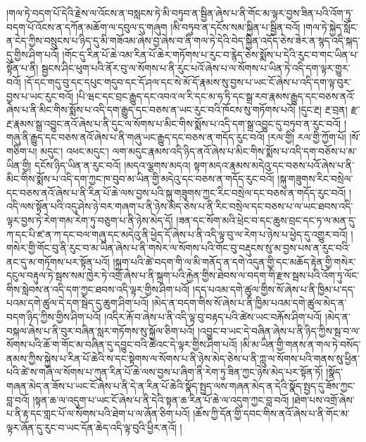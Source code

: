 །གལ་ཏེ་བདག་པོ་དེའི་རྗེས་ལ་འོངས་ན་བསླངས་ཏེ་མི་བཏུབ་ན་སྦྱིན་ཞེས་པ་ནི་གོང་མ་ལྟར་བྱས་ཟིན་པའི་འོག་ཏུ་བདག་པོ་འོངས་ན་དཀོན་མཆོག་ལ་དབུལ་དུ་གཞུག །མི་བཏུབ་ན་དངོས་སམ་སྐྱིན་པ་སྦྱིན་བའོ། །གལ་ཏེ་སྐྱེད་སློང་ན་ངེད་ཀྱིས་བསྲུངས་པ་ཉིད་དུ་མི་གཟོའམ་ཞེས་བྱ་ཞེས་བ་ནི་གལ་ཏེ་དེའི་བེད་སྐྱིན་འདོད་ཅེས་ཟེར་ན་སྙད་འདི་སྐད་དུ་གྱིས་ཤིག་པའོ། །གོང་དུ་རིན་པོ་ཆེ་འམ་རིན་པོ་ཆེར་གཏོགས་པ་རུང་བ་རྙེད་ཅེས་སྨོས་པ་དེའི་རུང་བ་གང་ཡིན་པ་སྟོན་པ་ནི། སྦྱངས་ཤིང་ཕུག་པའི་ནོར་བུ་ལ་སོགས་པ་ནི་རུང་པའོ་ཞེས་པ་ལ་སོགས་པ་ཡིན་ཏེ་འདི་དག་ལྟར་གྱུར་བའོ། །དོ་དང་གདུ་བུ་དང་དཔུང་གདུབ་དང་དོ་ཤལ་དང་སེ་མོ་དོ་རྣམས་སུ་བྱས་པ་ཡང་ངོ་ཞེས་པ་འདི་དག་ལྟ་བུར་བྱས་པ་ཡང་རུང་བའོ། །པི་ཝང་དང་བྲང་རྒྱུད་དང་འབའ་ལ་རི་དང་མ་ཧ་ཏི་དང་སྒྲ་རབ་རྣམས་རྒྱུད་དང་བཅས་ནའོ་ཞེས་པ་ནི་མིང་གིས་སྨོས་པ་འདི་དག་རྒྱུད་དང་བཅས་ན་ཡང་རུང་བའི་ཁོངས་སུ་གཏོགས་པའོ། །དུང་རྔ།  རྔ་བྲན། རྫ་རྔ་རྣམས་སྒྲ་འབྱུང་ནའོ་ཞེས་པ་ནི་དུང་ལ་སོགས་པ་མིང་གིས་སྨོས་པ་འདི་དག་སྒྲ་འབྱུང་དུ་བཏུབ་ན་རུང་བའོ། །གཞུ་ནི་རྒྱུད་དང་བཅས་ནའོ་ཞེས་པ་ནི་གཞུ་ཡང་རྒྱུད་དང་བཅས་ན་གདོད་རུང་བའོ། །རལ་གྱི། རལ་གྱི་ཀྱོག་པོ། །སོ་གཅིག་པ། མདུང་། འཕང་མདུང་། ལག་མདུང་རྣམས་འདི་ཉིད་ནའོ་ཞེས་པ་མིང་གིས་སྨོས་པ་འདི་དག་བཅོས་པ་མ་ཡིན་གྱི། དངོས་ཉིད་ཡིན་ན་རུང་བའོ། །མདའ་ལྕགས་མདའ། སྟག་མདའ་རྣམས་མདེའུ་དང་བཅས་པའོ་ཞེས་པ་ནི་མིང་གིས་སྨོས་པ་འདི་དག་ཀྱང་ཁ་བུབ་མ་ཡིན་གྱི་མདེའུ་དང་བཅས་ན་གདོད་རུང་བའོ། །སྐུ་གཟུགས་རིང་བསྲེལ་དང་བཅས་ནའོ་ཞེས་པ་ནི་རིན་པོ་ཆེ་ལས་བྱས་པའི་སྐུ་གཟུགས་ཀྱང་རིང་བསྲེལ་དང་བཅས་ན་གདོད་རུང་བའོ། །འདི་ལས་སྟོན་པའི་འདུ་ཤེས་ཉེ་བར་གཞག་པ་ནི་ཉེས་མེད་ཅེས་པ་ནི་རིང་བསྲེལ་དང་བཅས་པ་ལ་ཡང་ཐབས་འདི་ལྟར་བྱས་ཏེ་རེག་གམ་རེག་ཏུ་བཅུག་པ་ནི་ཉེས་མེད་དོ། །ཟན་དང་སོག་མའི་ཕྲེང་བ་དང་ཆུས་བྲང་དང་ཏ་ལ་མན་དུ་ཀ་དང་པི་ཛ་ན་ཀ་དང་བལ་གཞུ་དང་མདེའུ་ནི་ཕྱེད་དོ་ཞེས་པ་ནི་འདི་ལྟ་བུ་ལ་རེག་པ་ཉེས་པ་ཕྱེད་དུ་འགྱུར་བའོ། །གསེར་གྱི་གོང་བུ་ནི་རུང་བ་མ་ཡིན་ཞེས་པ་ནི་གསེར་ལ་སོགས་པའི་གོང་བུ་བརྡུངས་སུ་མ་བྱས་པས་ན་རུང་བའི་ནང་དུ་མ་གཏོགས་པར་སྟོན་པའོ། །སྐྲག་པའི་ཚེ་བདག་གི་ལ་མི་གནོད་ན་དགེ་འདུན་གྱི་དང་མཆོད་རྟེན་གྱི་གསེར་དངུལ་བརྟུལ་ཏེ་སྦས་སམ་ཁྱེར་ཏེ་འགྲོ་ཞེས་པ་ནི་སྐྲག་པའི་རྐྱེན་གྱིས་ཐེབས་ལ་བདག་གི་རྫས་སྦས་པའི་འོག་ཏུ་ལོང་གིས་སླེབས་ན་འདི་དག་ཀྱང་ཐབས་འདི་ལྟར་གྱིས་ཤིག་པའོ། །དད་པའམ་དགེ་ཚུལ་གྱིས་སོ་ཞེས་པ་ནི་ཁྱིམ་པ་དད་པའམ་དགེ་ཚུལ་དེ་དག་སྦེད་དུ་ཆུག་ཤིག་པའོ། །མེད་ན་བདག་གིས་སོ་ཞེས་པ་ནི་ཁྱིམ་པའམ་དགེ་ཚུལ་མེད་ན་བདག་ཉིད་ཀྱིས་གྱིས་ཤིག་པའོ། །འདིར་རྐོ་བ་ཞེས་པ་ནི་འདི་ལྟ་བུ་བརྟད་པའི་ཚེས་ཡང་བརྐོས་ཤིག་པའོ། །མེད་ན་བསྐལ་ཞེས་པ་ནི་བུར་བཞིན་སླར་གཏོགས་སུ་སྐྱོལ་ཅིག་པའོ། །འབྱུང་བ་ཡང་དེ་བཞིན་ཞེས་པ་ནི་ཉིད་ཀྱིས་སྦ་བ་ལ་སོགས་པའི་ཆོ་ག་གོང་མ་བཞིན་དུ་དབྱུང་བའི་ཚེའང་དེ་ལྟར་གྱིས་ཤིག་པའོ། །མི་མ་ཡིན་གྱི་གནས་ན་གལ་ཏེ་བསོད་ནམས་ཀྱིས་སྐྱེས་པ་རིན་པོ་ཆེའི་ས་དང་སྟེགས་ལ་སོགས་པ་ནི་ཉེས་མེད་ཅེས་པ་ནི་ཀླུ་ལ་སོགས་པའི་གནས་སུ་ཕྱིན་པའི་ཚེ་ས་གཞི་ལ་སོགས་པ་ཀུན་རིན་པོ་ཆེ་ལས་བྱས་པ་ཞིག་ནི་རེག་ཏུ་ཟིན་ཀྱང་ཉེས་མེད་པར་སྟོན་ཏོ། །སྣོད་གཞན་མེད་ན་ཟོས་པ་ཡང་ངོ་ཞེས་པ་ནི་དེ་ན་རིན་པོ་ཆེའི་སྣོད་སྤྱད་ལས་གཞན་མེད་ན་དེའི་སྣོད་སྤྱད་དུ་ཟོས་ཀྱང་བླ་བའོ། །སྟན་ཆ་ལ་འདུག་པ་ཡང་ངོ་ཞེས་པ་ནི་དེའི་སྟན་ཆ་རིན་པོ་ཆེ་ལ་འདུག་ཀྱང་བླ་བའོ། །ཐེག་པས་འགྲོ་ཞེས་པ་ནི་རྟ་དང་གླང་པོ་ལ་སོགས་པའི་ཐེག་པ་ལ་ཞོན་ཅིག་པའོ། །ཆོས་ཀྱི་དོན་གྱི་དབང་གིས་ནའོ་ཞེས་པ་ནི་གོང་མ་ལྟར་ཞོན་དུ་རུང་བ་ཡང་དོན་ཆེད་འདི་ལྟ་བུའི་ཕྱིར་ནའོ། །
